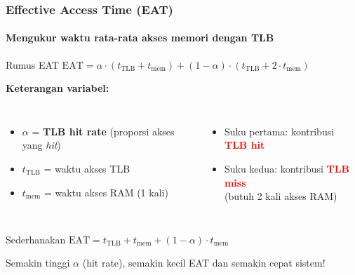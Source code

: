 \documentclass[t,aspectratio=169,xcolor=dvipsnames]{beamer}
\newcommand{\tem}[1]{\textbf{\textcolor{red}{#1}}}
\begin{document}
\begin{frame}
    \frametitle{Effective Access Time (EAT)}
    \framesubtitle{Mengukur waktu rata-rata akses memori dengan TLB}
    \small

    \begin{block}{Rumus EAT}
        \centering
        \vspace{0.1cm}
        $\text{EAT} = \alpha \cdot (t_{\text{TLB}} + t_{\text{mem}}) + (1 - \alpha) \cdot (t_{\text{TLB}} + 2 \cdot t_{\text{mem}})$
        \vspace{0.1cm}
    \end{block}

    \vspace{0.2cm}
    \textbf{Keterangan variabel:}
    \begin{columns}[T]
        \begin{itemize}
            \item $\alpha$ = \textbf{TLB hit rate} (proporsi akses yang \textit{hit})
            \item $t_{\text{TLB}}$ = waktu akses TLB
            \item $t_{\text{mem}}$ = waktu akses RAM (1 kali)
        \end{itemize}

        \begin{itemize}
            \item Suku pertama: kontribusi \tem{TLB hit}
            \item Suku kedua: kontribusi \tem{TLB miss}\\(butuh 2 kali akses RAM)
        \end{itemize}
    \end{columns}

    \vspace{0.25cm}
    \begin{exampleblock}{Sederhanakan}
        \centering
        $\text{EAT} = t_{\text{TLB}} + t_{\text{mem}} + (1-\alpha) \cdot t_{\text{mem}}$

        \vspace{0.1cm}
        \footnotesize Semakin tinggi $\alpha$ (hit rate), semakin kecil EAT dan semakin cepat sistem!
    \end{exampleblock}
\end{frame}
\end{document}
